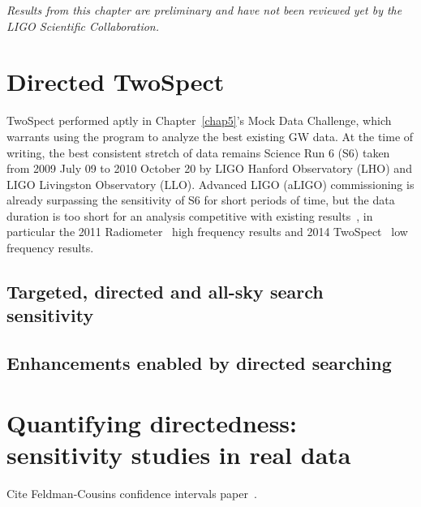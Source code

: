 
\textit{Results from this chapter are preliminary and have not been reviewed yet by the LIGO Scientific Collaboration.}

        \section{Directed TwoSpect}
        \label{directed}

TwoSpect performed aptly in Chapter~\ref{chap5}'s Mock Data Challenge, which warrants using the program to analyze the best existing GW data.
At the time of writing, the best consistent stretch of data remains Science Run 6 (S6) taken from 2009 July 09 to 2010 October 20 by LIGO Hanford Observatory (LHO) and LIGO Livingston Observatory (LLO).
Advanced LIGO (aLIGO) commissioning is already surpassing the sensitivity of S6 for short periods of time, but the data duration is too short for an analysis competitive with existing results~\cite{AbbottScoX12007}, in particular the 2011 Radiometer~\cite{AbadieStoch2011} high frequency results and 2014 TwoSpect~\cite{GoetzTwoSpectResults2014} low frequency results.


            \subsection{Targeted, directed and all-sky search sensitivity}
            \label{tradeoffs}


            \subsection{Enhancements enabled by directed searching}
            \label{directed_enhancements}


        \section{Quantifying directedness: sensitivity studies in real data}
        \label{quant_directed}



            Cite Feldman-Cousins confidence intervals paper~\cite{FeldmanCousins1998}.

